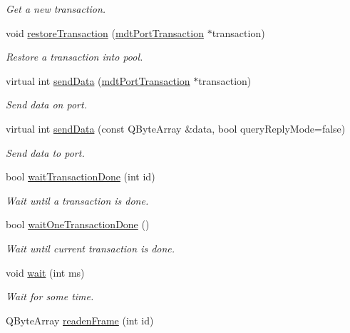 \begin{DoxyCompactItemize}
\begin{DoxyCompactList}\small\item\em Get a new transaction. \end{DoxyCompactList}\item 
void \hyperlink{classmdt_port_manager_a5fea4a9b8e94d38e8ec699dba05c7ca8}{restore\-Transaction} (\hyperlink{classmdt_port_transaction}{mdt\-Port\-Transaction} $\ast$transaction)
\begin{DoxyCompactList}\small\item\em Restore a transaction into pool. \end{DoxyCompactList}\item 
virtual int \hyperlink{classmdt_port_manager_ad98399edba146af5cf32a9002094385c}{send\-Data} (\hyperlink{classmdt_port_transaction}{mdt\-Port\-Transaction} $\ast$transaction)
\begin{DoxyCompactList}\small\item\em Send data on port. \end{DoxyCompactList}\item 
virtual int \hyperlink{classmdt_port_manager_a445b27f0819158f67f1bd548cdd2fedf}{send\-Data} (const Q\-Byte\-Array \&data, bool query\-Reply\-Mode=false)
\begin{DoxyCompactList}\small\item\em Send data to port. \end{DoxyCompactList}\item 
bool \hyperlink{classmdt_port_manager_a5551802de2c08632078f2cc0e2607913}{wait\-Transaction\-Done} (int id)
\begin{DoxyCompactList}\small\item\em Wait until a transaction is done. \end{DoxyCompactList}\item 
bool \hyperlink{classmdt_port_manager_af60f089baded850018cbb90645c8e547}{wait\-One\-Transaction\-Done} ()
\begin{DoxyCompactList}\small\item\em Wait until current transaction is done. \end{DoxyCompactList}\item 
void \hyperlink{classmdt_port_manager_aaa85e0200aba0e0f4392dfe01abae2cf}{wait} (int ms)
\begin{DoxyCompactList}\small\item\em Wait for some time. \end{DoxyCompactList}\item 
Q\-Byte\-Array \hyperlink{classmdt_port_manager_a830ae182d06dd6a52c43a7f45b9240ac}{readen\-Frame} (int id)

\end{DoxyCompactItemize}
